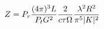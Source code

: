 \documentclass[preview]{standalone}
\begin{document}
\begin{align*}
\special{dvisvgm:raw <g id='unique000'>}Z = P_r \frac{(4 \pi)^3 L}{P_t G^2} \frac{2}{c \tau \Omega} \frac{\lambda^2 R^2}{\pi^5 |K|^2}\special{dvisvgm:raw </g>}
\end{align*}
\end{document}
